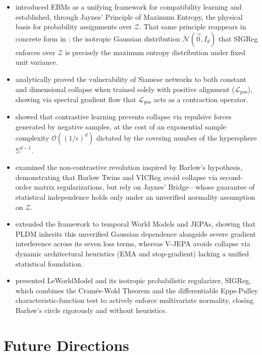 \documentclass[11pt, oneside, openany]{book}
\begin{document}
\begin{itemize}
    \item \textbf{} introduced EBMs as a unifying framework for compatibility learning and established, through Jaynes' Principle of Maximum Entropy, the physical basis for probability assignments over $\mathcal{Z}$. That same principle reappears in concrete form in : the isotropic Gaussian distribution $\mathcal{N}(\vec{0}, I_{d})$ that SIGReg enforces over $\mathcal{Z}$ is precisely the maximum entropy distribution under fixed unit variance.
    \item \textbf{} analytically proved the vulnerability of Siamese networks to both constant and dimensional collapse when trained solely with positive alignment ($\mathcal{L}_{\text{pos}}$), showing via spectral gradient flow that $\mathcal{L}_{\text{pos}}$ acts as a contraction operator.
    \item \textbf{} showed that contrastive learning prevents collapse via repulsive forces generated by negative samples, at the cost of an exponential sample complexity $\mathcal{O}((1/\epsilon)^{d})$ dictated by the covering number of the hypersphere $\mathbb{S}^{d-1}$.
    \item \textbf{} examined the non-contrastive revolution inspired by Barlow's hypothesis, demonstrating that Barlow Twins and VICReg avoid collapse via second-order matrix regularizations, but rely on Jaynes' Bridge---whose guarantee of statistical independence holds only under an unverified normality assumption on $\mathcal{Z}$.
    \item \textbf{} extended the framework to temporal World Models and JEPAs, showing that PLDM inherits this unverified Gaussian dependence alongside severe gradient interference across its seven loss terms, whereas V-JEPA avoids collapse via dynamic architectural heuristics (EMA and stop-gradient) lacking a unified statistical foundation.
    \item \textbf{} presented LeWorldModel and its isotropic probabilistic regularizer, SIGReg, which combines the Cram\'er-Wold Theorem and the differentiable Epps-Pulley characteristic-function test to actively enforce multivariate normality, closing Barlow's circle rigorously and without heuristics.
\end{itemize}

\section{Future Directions}
\label{sec:8.2}
\end{document}
